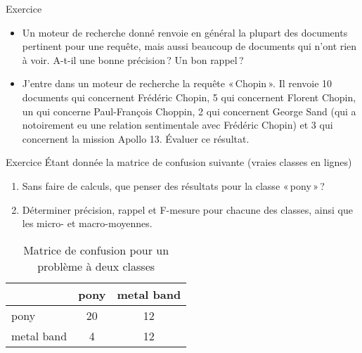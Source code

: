 \documentclass[../allslides.tex]{subfiles}
\begin{document}
\renewcommand\docdate{2020-02-11}  %




\begin{frame}{Exercice}
	\begin{itemize}
		\item Un moteur de recherche donné renvoie en général la plupart des documents pertinent pour une requête, mais aussi beaucoup de documents qui n'ont rien à voir. A-t-il une bonne précision ? Un bon rappel ?
		\item J'entre dans un moteur de recherche la requête « Chopin ». Il renvoie \num{10} documents qui concernent Frédéric Chopin, \num{5} qui concernent Florent Chopin, un qui concerne Paul-François Choppin, \num{2} qui concernent George Sand (qui a notoirement eu une relation sentimentale avec Frédéric Chopin) et \num{3} qui concernent la mission Apollo 13. Évaluer ce résultat.
	\end{itemize}
\end{frame}

\begin{frame}[fragile=singleslide]{Exercice}
	Étant donnée la matrice de confusion suivante (vraies classes en lignes)
	\begin{enumerate}
		\item Sans faire de calculs, que penser des résultats pour la classe « pony » ?
		\item Déterminer précision, rappel et F-mesure pour chacune des classes, ainsi que les micro- et macro-moyennes.
	\end{enumerate}
	\begin{table}
		\begin{tabu}{|l|*{2}{c|}}
			\hline
						&  pony    & metal band\\
			\hline
			pony        & \num{20} & \num{12}\\
			\hline
			metal band  & \num{4}  & \num{12}\\
			\hline
		\end{tabu}
		\caption{Matrice de confusion pour un problème à deux classes}
	\end{table}

	{\small{}}
\end{frame}

\end{document}
